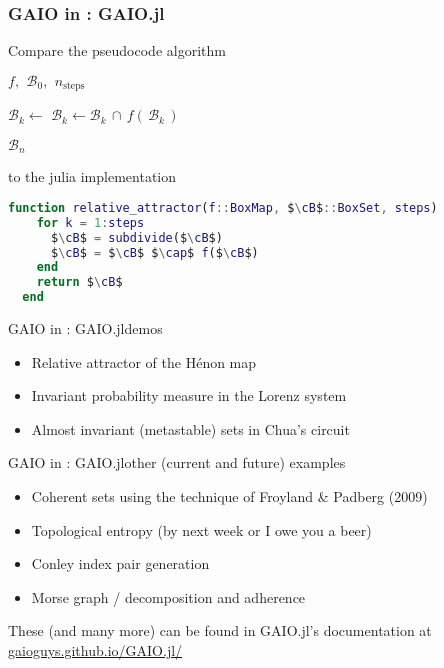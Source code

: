 \documentclass[
  english,            %
  aspectratio=169,    %
]{tumbeamer}
\newcommand{\cB}{\mathcal{B}}
\begin{document}
\begin{frame}[fragile]
\frametitle{GAIO in {\LARGE \julia}: GAIO.jl}


Compare the pseudocode algorithm
  
\begin{algorithmic}[1]
    \Require $f,\,\ \cB_0,\,\ n_{\text{steps}}$

        \State $\mathcal{B}_k \gets$ 
        \State $\mathcal{B}_k \gets \mathcal{B}_k\, \cap\, f (\,\mathcal{B}_k\,)$
    \EndFor

    \State \Return $\mathcal{B}_n$ 
\end{algorithmic}

to the julia implementation

\begin{lstlisting}[language=Matlab,mathescape]
  function relative_attractor(f::BoxMap, $\cB$::BoxSet, steps)
    for k = 1:steps
      $\cB$ = subdivide($\cB$)
      $\cB$ = $\cB$ $\cap$ f($\cB$)
    end
    return $\cB$
  end
\end{lstlisting}

\end{frame}

\begin{frame}{GAIO in {\LARGE \julia}: GAIO.jl}{demos}

\begin{itemize}
  \item Relative attractor of the Hénon map \vspace*{2ex}
  \item Invariant probability measure in the Lorenz system \vspace*{2ex}
  \item Almost invariant (metastable) sets in Chua's circuit \vspace*{2ex}
\end{itemize}

\end{frame}

\begin{frame}{GAIO in {\LARGE \julia}: GAIO.jl}{other (current and future) examples}

\begin{itemize}
  \item Coherent sets using the technique of Froyland \& Padberg (2009)
  \item Topological entropy (by next week or I owe you a beer)
  \item Conley index pair generation
  \item Morse graph / decomposition and adherence
\end{itemize}

These (and many more) can be found in GAIO.jl's documentation at \url{gaioguys.github.io/GAIO.jl/}  
  
\end{frame}
\end{document}
